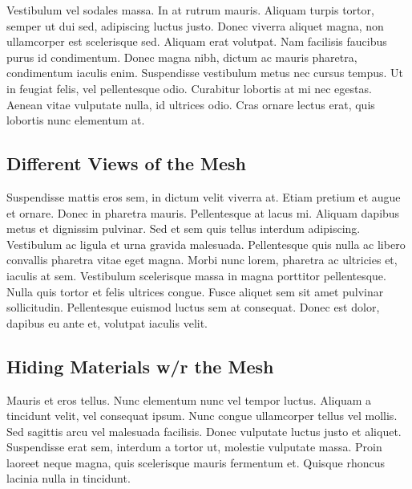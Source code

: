 Vestibulum vel sodales massa. In at rutrum mauris. Aliquam turpis tortor, semper ut dui sed, adipiscing luctus justo. Donec viverra aliquet magna, non ullamcorper est scelerisque sed. Aliquam erat volutpat. Nam facilisis faucibus purus id condimentum. Donec magna nibh, dictum ac mauris pharetra, condimentum iaculis enim. Suspendisse vestibulum metus nec cursus tempus. Ut in feugiat felis, vel pellentesque odio. Curabitur lobortis at mi nec egestas. Aenean vitae vulputate nulla, id ultrices odio. Cras ornare lectus erat, quis lobortis nunc elementum at.

\subsection{Different Views of the Mesh}
Suspendisse mattis eros sem, in dictum velit viverra at. Etiam pretium et augue et ornare. Donec in pharetra mauris. Pellentesque at lacus mi. Aliquam dapibus metus et dignissim pulvinar. Sed et sem quis tellus interdum adipiscing. Vestibulum ac ligula et urna gravida malesuada. Pellentesque quis nulla ac libero convallis pharetra vitae eget magna. Morbi nunc lorem, pharetra ac ultricies et, iaculis at sem. Vestibulum scelerisque massa in magna porttitor pellentesque. Nulla quis tortor et felis ultrices congue. Fusce aliquet sem sit amet pulvinar sollicitudin. Pellentesque euismod luctus sem at consequat. Donec est dolor, dapibus eu ante et, volutpat iaculis velit.

\subsection{Hiding Materials w/r the Mesh}
Mauris et eros tellus. Nunc elementum nunc vel tempor luctus. Aliquam a tincidunt velit, vel consequat ipsum. Nunc congue ullamcorper tellus vel mollis. Sed sagittis arcu vel malesuada facilisis. Donec vulputate luctus justo et aliquet. Suspendisse erat sem, interdum a tortor ut, molestie vulputate massa. Proin laoreet neque magna, quis scelerisque mauris fermentum et. Quisque rhoncus lacinia nulla in tincidunt.